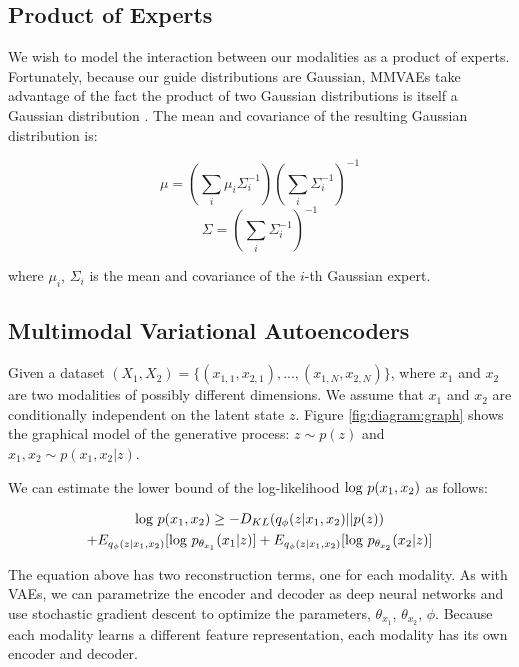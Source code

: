 \documentclass{article}
\begin{document}
\subsection{Product of Experts}

We wish to model the interaction between our modalities as a product of experts. Fortunately, because our guide distributions are Gaussian, MMVAEs take advantage of the fact the product of two Gaussian distributions is itself a Gaussian distribution \cite{cao2014generalized}. The mean and covariance of the resulting Gaussian distribution is:

\begin{equation}
    \mu = (\sum_{i} \mu_{i}\Sigma^{-1}_{i})(\sum_{i}\Sigma^{-1}_{i})^{-1}
\end{equation}
\begin{equation}
    \Sigma = (\sum_{i} \Sigma^{-1}_{i})^{-1}
\end{equation}

where $\mu_{i}$, $\Sigma_{i}$ is the mean and covariance of the $i$-th Gaussian expert.

\subsection{Multimodal Variational Autoencoders}
Given a dataset $(X_{1}, X_{2}) = \{ (x_{1,1}, x_{2,1}), ..., (x_{1,N}, x_{2,N}) \}$, where $x_{1}$ and $x_{2}$ are two modalities of possibly different dimensions. We assume that $x_{1}$ and $x_{2}$ are conditionally independent on the latent state $z$. Figure \ref{fig:diagram:graph} shows the graphical model of the generative process: $z \sim p(z)$ and $x_{1}, x_{2} \sim p(x_{1}, x_{2} | z)$.

We can estimate the lower bound of the log-likelihood $\textup{log }p(x_{1}, x_{2})$ as follows:

\begin{multline}
\textup{log }p(x_{1}, x_{2}) \geq -D_{KL}(q_{\phi}(z | x_{1}, x_{2}) || p(z)) \\ + E_{q_{\phi}(z | x_{1}, x_{2})}[\textup{log } p_{\theta_{x_{1}}}(x_{1} | z)] + E_{q_{\phi}(z | x_{1}, x_{2})}[\textup{log } p_{\theta_{x_{2}}}(x_{2} | z)]
\end{multline}

The equation above has two reconstruction terms, one for each modality. As with VAEs, we can parametrize the encoder and decoder as deep neural networks and use stochastic gradient descent to optimize the parameters, $\theta_{x_{1}}$, $\theta_{x_{2}}$, $\phi$. Because each modality learns a different feature representation, each modality has its own encoder and decoder.
\end{document}
